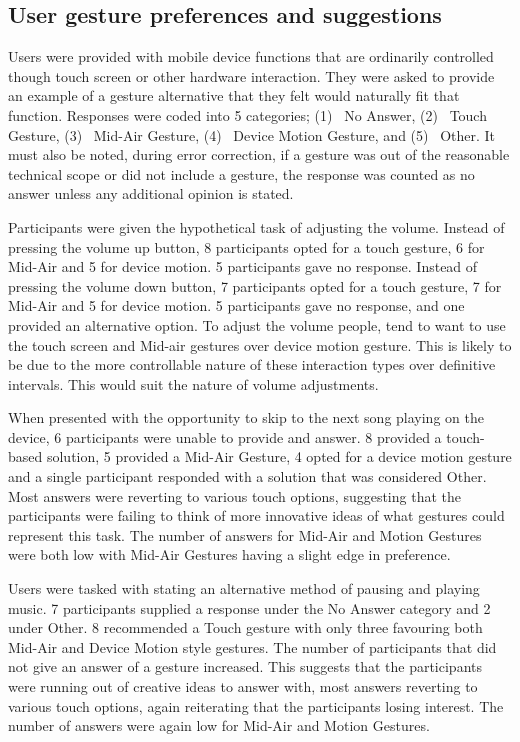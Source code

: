 \documentclass{l4proj}
\begin{document}
\subsection{User gesture preferences and suggestions}

Users were provided with mobile device functions that are ordinarily controlled though touch screen or other hardware interaction. They were asked to provide an example of a gesture alternative that they felt would naturally fit that function. Responses were coded into 5 categories; (1)~ No Answer, (2)~ Touch Gesture, (3)~ Mid-Air Gesture, (4)~ Device Motion Gesture, and (5)~ Other. It must also be noted, during error correction, if a gesture was out of the reasonable technical scope or did not include a gesture, the response was counted as no answer unless any additional opinion is stated.

Participants were given the hypothetical task of adjusting the volume. Instead of pressing the volume up button, 8 participants opted for a touch gesture, 6 for Mid-Air and 5 for device motion. 5 participants gave no response. Instead of pressing the volume down button, 7 participants opted for a touch gesture, 7 for Mid-Air and 5 for device motion. 5 participants gave no response, and one provided an alternative option. To adjust the volume people, tend to want to use the touch screen and Mid-air gestures over device motion gesture. This is likely to be due to the more controllable nature of these interaction types over definitive intervals. This would suit the nature of volume adjustments.

When presented with the opportunity to skip to the next song playing on the device, 6 participants were unable to provide and answer. 8 provided a touch-based solution, 5 provided a Mid-Air Gesture, 4 opted for a device motion gesture and a single participant responded with a solution that was considered Other. Most answers were reverting to various touch options, suggesting that the participants were failing to think of more innovative ideas of what gestures could represent this task. The number of answers for Mid-Air and Motion Gestures were both low with Mid-Air Gestures having a slight edge in preference.

Users were tasked with stating an alternative method of pausing and playing music. 7 participants supplied a response under the No Answer category and 2 under Other. 8 recommended a Touch gesture with only three favouring both Mid-Air and Device Motion style gestures. The number of participants that did not give an answer of a gesture increased. This suggests that the participants were running out of creative ideas to answer with, most answers reverting to various touch options, again reiterating that the participants losing interest. The number of answers were again low for Mid-Air and Motion Gestures.
\end{document}
